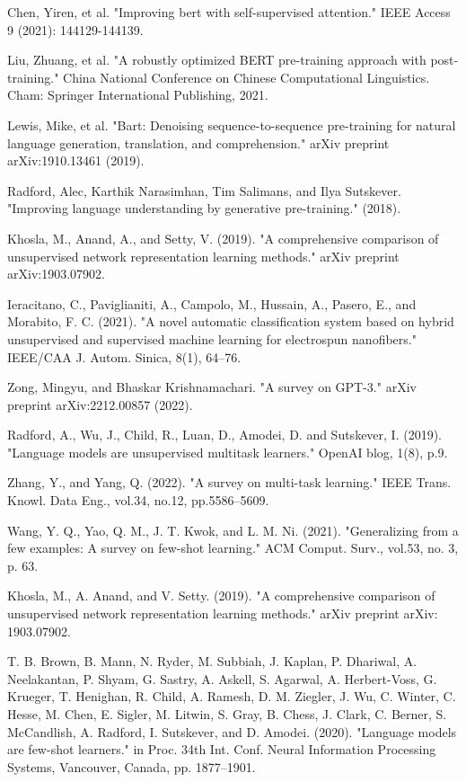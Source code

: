 \documentclass[fleqn,10pt]{thescipub} %
\begin{document}
\begin{enumerate}
Chen, Yiren, et al. "Improving bert with self-supervised attention." IEEE Access 9 (2021): 144129-144139.

Liu, Zhuang, et al. "A robustly optimized BERT pre-training approach with post-training." China National Conference on Chinese Computational Linguistics. Cham: Springer International Publishing, 2021.

Lewis, Mike, et al. "Bart: Denoising sequence-to-sequence pre-training for natural language generation, translation, and comprehension." arXiv preprint arXiv:1910.13461 (2019).

Radford, Alec, Karthik Narasimhan, Tim Salimans, and Ilya Sutskever. "Improving language understanding by generative pre-training." (2018).

Khosla, M., Anand, A., and  Setty, V. (2019). "A comprehensive comparison of unsupervised network representation learning methods." arXiv preprint arXiv:1903.07902.

Ieracitano, C., Paviglianiti, A., Campolo, M., Hussain, A., Pasero, E., and Morabito, F. C. (2021). "A novel automatic classification system based on hybrid unsupervised and supervised machine learning for electrospun nanofibers." IEEE/CAA J. Autom. Sinica, 8(1), 64–76.

Zong, Mingyu, and Bhaskar Krishnamachari. "A survey on GPT-3." arXiv preprint arXiv:2212.00857 (2022).

Radford, A., Wu, J., Child, R., Luan, D., Amodei, D. and Sutskever, I. (2019). "Language models are unsupervised multitask learners." OpenAI blog, 1(8), p.9.

Zhang, Y., and Yang, Q. (2022). "A survey on multi-task learning." IEEE Trans. Knowl. Data Eng., vol.34, no.12, pp.5586–5609.

Wang, Y. Q., Yao, Q. M., J. T. Kwok, and L. M. Ni. (2021). "Generalizing from a few examples: A survey on few-shot learning." ACM Comput. Surv., vol.53, no. 3, p. 63.

Khosla, M., A. Anand, and V. Setty. (2019). "A comprehensive comparison of unsupervised network representation learning methods." arXiv preprint arXiv: 1903.07902.

T. B. Brown, B. Mann, N. Ryder, M. Subbiah, J. Kaplan, P. Dhariwal, A. Neelakantan, P. Shyam, G. Sastry, A. Askell, S. Agarwal, A. Herbert-Voss, G. Krueger, T. Henighan, R. Child, A. Ramesh, D. M. Ziegler, J. Wu, C. Winter, C. Hesse, M. Chen, E. Sigler, M. Litwin, S. Gray, B. Chess, J. Clark, C. Berner, S. McCandlish, A. Radford, I. Sutskever, and D. Amodei. (2020). "Language models are few-shot learners." in Proc. 34th Int. Conf. Neural Information Processing Systems, Vancouver, Canada, pp. 1877–1901.


\end{enumerate}
\end{document}
